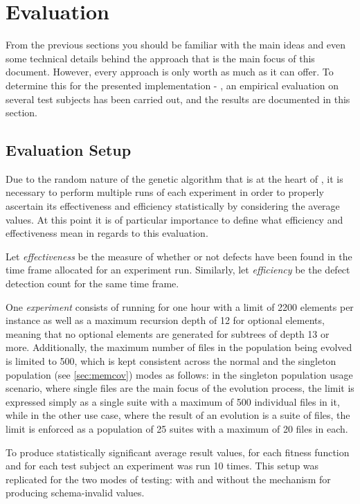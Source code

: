 \section{Evaluation}
\label{sec:evaluation}
From the previous sections you should be familiar with the main ideas and even some technical details behind
the approach that is the main focus of this document. However, every approach is only worth as much as it can
offer. To determine this for the presented implementation - \xmlmate, an empirical evaluation on several test
subjects has been carried out, and the results are documented in this section.
\subsection{Evaluation Setup}

Due to the random nature of the genetic algorithm that is at the heart of \xmlmate, it is necessary to perform
multiple runs of each experiment in order to properly ascertain its effectiveness and efficiency statistically
by considering the average values. At this point it is of particular importance to define what efficiency and
effectiveness mean in regards to this evaluation. 

Let \emph{effectiveness} be the measure of whether or not defects have been found in the time frame allocated
for an experiment run. Similarly, let \emph{efficiency} be the defect detection count for the same time frame.

One \emph{experiment} consists of running \xmlmate for one hour with a limit of 2200 elements per \xml instance
as well as a maximum recursion depth of 12 for optional elements, meaning that no optional elements are generated
for subtrees of depth 13 or more. Additionally, the maximum number of \xml files in the population being
evolved is limited to 500, which is kept consistent across the normal and the singleton population (see
\cref{sec:memcov}) modes as follows: in the singleton population usage scenario, where single files are the
main focus of the evolution process, the limit is expressed simply as a single suite with a maximum of 500
individual files in it, while in the other use case, where the result of an evolution is a suite of files, the
limit is enforced as a population of 25 suites with a maximum of 20 files in each.

To produce statistically significant average result values, for each fitness function and for each test
subject an experiment was run 10 times. This setup was replicated for the two modes of testing: with and
without the mechanism for producing schema-invalid values.

